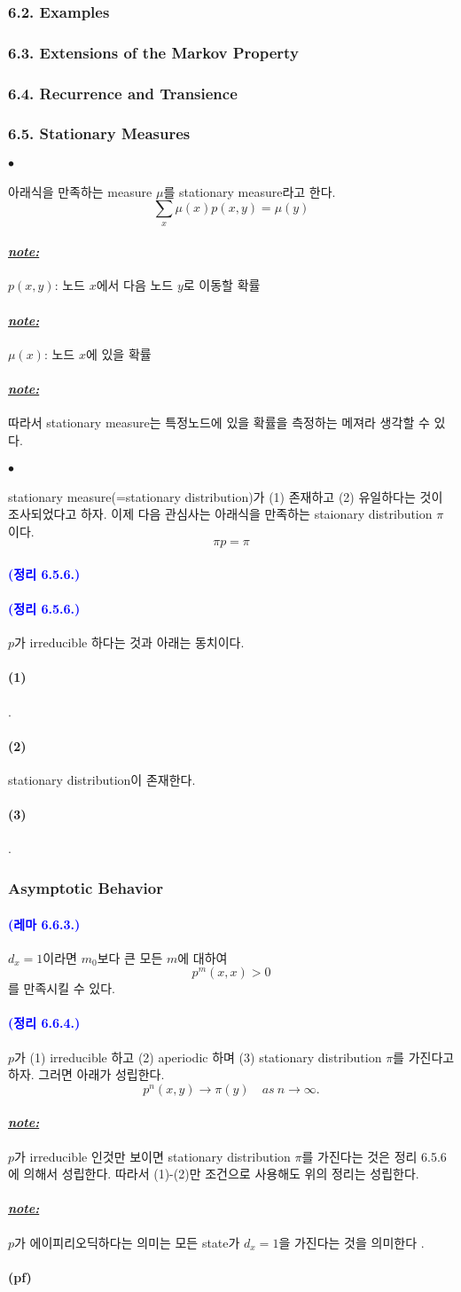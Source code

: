 \documentclass[12pt,oneside,english]{book}
\def\ck{\paragraph{\Large$\bullet$}\Large}
\def\pf{\paragraph{\Large(pf)}\Large}
\def\note{\paragraph{\Large\textit{\underline{note:}}}\Large}
\newcommand{\parablue}[1]{\paragraph{\Large\textcolor{blue}{(#1)}}\Large}
\def\one{\paragraph{\Large(1)}\Large}
\def\two{\paragraph{\Large(2)}\Large}
\def\three{\paragraph{\Large(3)}\Large}
\begin{document}
\subsubsection{6.2. Examples}

\subsubsection{6.3. Extensions of the Markov Property}

\subsubsection{6.4. Recurrence and Transience}

\subsubsection{6.5. Stationary Measures}
\ck 아래식을 만족하는 measure $\mu$를 stationary measure라고 한다. 
\[
\sum_x\mu(x)p(x,y)=\mu(y)
\]
\note $p(x,y)$: 노드 $x$에서 다음 노드 $y$로 이동할 확률
\note $\mu(x)$: 노드 $x$에 있을 확률
\note 따라서 stationary measure는 특정노드에 있을 확률을 측정하는 메져라 생각할 수 있다. 


\ck stationary measure(=stationary distribution)가 (1) 존재하고 (2) 유일하다는 것이 조사되었다고 하자. 이제 다음 관심사는 아래식을 만족하는 staionary distribution $\pi$이다. 
\[
\pi p =\pi
\]

\parablue{정리 6.5.6.} 

\parablue{정리 6.5.6.} $p$가 irreducible 하다는 것과 아래는 동치이다. 
\one .
\two stationary distribution이 존재한다. 
\three . 


\subsubsection{Asymptotic Behavior}
\parablue{레마 6.6.3.} $d_x=1$이라면 $m_0$보다 큰 모든 $m$에 대하여 
\[
p^m(x,x)>0
\]
를 만족시킬 수 있다. 

\parablue{정리 6.6.4.} $p$가 (1) irreducible 하고 (2) aperiodic 하며 (3) stationary distribution $\pi$를 가진다고 하자. 그러면 아래가 성립한다. 
\[
p^{n}(x,y) \to \pi(y) \quad as~ n\to \infty .
\]
\note $p$가 irreducible 인것만 보이면 stationary distribution $\pi$를 가진다는 것은 정리 6.5.6에 의해서 성립한다. 따라서 (1)-(2)만 조건으로 사용해도 위의 정리는 성립한다. 
\note $p$가 에이피리오딕하다는 의미는 모든 state가 $d_x=1$을 가진다는 것을 의미한다 .

\pf
\end{document}
